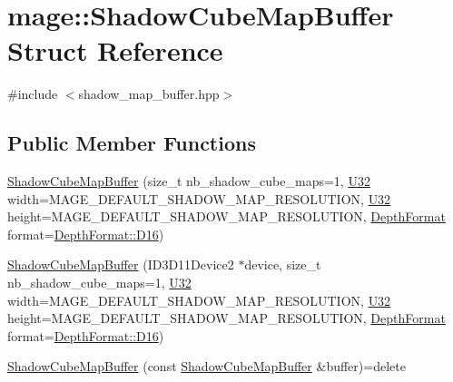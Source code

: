 \hypertarget{structmage_1_1_shadow_cube_map_buffer}{}\section{mage\+:\+:Shadow\+Cube\+Map\+Buffer Struct Reference}
\label{structmage_1_1_shadow_cube_map_buffer}


{\ttfamily \#include $<$shadow\+\_\+map\+\_\+buffer.\+hpp$>$}

\subsection*{Public Member Functions}
\begin{DoxyCompactItemize}
\item 
\hyperlink{structmage_1_1_shadow_cube_map_buffer_a5dfc8bb6a335ce640cffbaf823657cb7}{Shadow\+Cube\+Map\+Buffer} (size\+\_\+t nb\+\_\+shadow\+\_\+cube\+\_\+maps=1, \hyperlink{namespacemage_a41c104c036fba3756a74e19f793eeaa1}{U32} width=M\+A\+G\+E\+\_\+\+D\+E\+F\+A\+U\+L\+T\+\_\+\+S\+H\+A\+D\+O\+W\+\_\+\+M\+A\+P\+\_\+\+R\+E\+S\+O\+L\+U\+T\+I\+ON, \hyperlink{namespacemage_a41c104c036fba3756a74e19f793eeaa1}{U32} height=M\+A\+G\+E\+\_\+\+D\+E\+F\+A\+U\+L\+T\+\_\+\+S\+H\+A\+D\+O\+W\+\_\+\+M\+A\+P\+\_\+\+R\+E\+S\+O\+L\+U\+T\+I\+ON, \hyperlink{namespacemage_aed4c3f883a30484d0a20762c06be81d4}{Depth\+Format} format=\hyperlink{namespacemage_aed4c3f883a30484d0a20762c06be81d4a6fd9ec81643ee5a57f85a71951bfe13d}{Depth\+Format\+::\+D16})
\item 
\hyperlink{structmage_1_1_shadow_cube_map_buffer_ae18fd3e33d5fc9afc3450b0b8f044eb9}{Shadow\+Cube\+Map\+Buffer} (I\+D3\+D11\+Device2 $\ast$device, size\+\_\+t nb\+\_\+shadow\+\_\+cube\+\_\+maps=1, \hyperlink{namespacemage_a41c104c036fba3756a74e19f793eeaa1}{U32} width=M\+A\+G\+E\+\_\+\+D\+E\+F\+A\+U\+L\+T\+\_\+\+S\+H\+A\+D\+O\+W\+\_\+\+M\+A\+P\+\_\+\+R\+E\+S\+O\+L\+U\+T\+I\+ON, \hyperlink{namespacemage_a41c104c036fba3756a74e19f793eeaa1}{U32} height=M\+A\+G\+E\+\_\+\+D\+E\+F\+A\+U\+L\+T\+\_\+\+S\+H\+A\+D\+O\+W\+\_\+\+M\+A\+P\+\_\+\+R\+E\+S\+O\+L\+U\+T\+I\+ON, \hyperlink{namespacemage_aed4c3f883a30484d0a20762c06be81d4}{Depth\+Format} format=\hyperlink{namespacemage_aed4c3f883a30484d0a20762c06be81d4a6fd9ec81643ee5a57f85a71951bfe13d}{Depth\+Format\+::\+D16})
\item 
\hyperlink{structmage_1_1_shadow_cube_map_buffer_afe0bdf6a81df1a3efde7d34b65f4e351}{Shadow\+Cube\+Map\+Buffer} (const \hyperlink{structmage_1_1_shadow_cube_map_buffer}{Shadow\+Cube\+Map\+Buffer} \&buffer)=delete

\end{DoxyCompactItemize}
